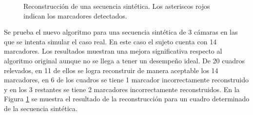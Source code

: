 \begin{figure}[ht!]
   \caption{Reconstrucción de una secuencia sintética. Los asteriscos rojos indican los marcadores detectados.} 
   \label{img_reconstruccion_sintetica}    
\end{figure} 

 
Se prueba el nuevo algoritmo para una secuencia sintética de 3 cámaras en las que se intenta simular el caso real. En este caso el sujeto cuenta con 14 marcadores. 
Los resultados muestran una mejora significativa respecto al algoritmo original
aunque no se llega a tener un desempeño ideal. 
De 20 cuadros relevados, en 11 de ellos se logra reconstruir de manera aceptable los 14 marcadores, en 6 de los cuadros se tiene 1 marcador incorrectamente reconstruido y en los 3 restantes se tiene 2 marcadores incorrectamente reconstruidos.
En la Figura \ref{img_reconstruccion_sintetica} se muestra el resultado de la reconstrucción para un cuadro  determinado de la secuencia sintética.

